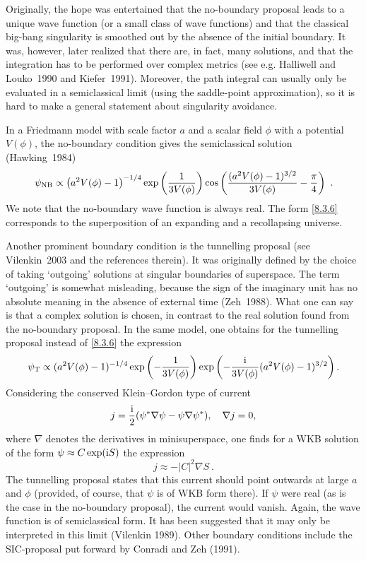 \documentclass[12pt,a4paper]{article}
\newcommand{\be}{\begin{equation}}
\newcommand{\ee}{\end{equation}}
\newcommand{\lb}{\label}
\newcommand{\I}{{\rm i}}
\begin{document}
Originally, the hope was entertained that the no-boundary proposal
leads to a unique wave function (or a small class of wave functions)
and that the classical big-bang singularity is smoothed out by the
absence of the initial boundary. It was, however, later realized that
there are, in fact, many solutions, and that the integration has to be
performed over complex metrics (see e.g. Halliwell and Louko~1990 and
Kiefer~1991). Moreover, the path integral can usually only be
evaluated in a semiclassical limit (using the saddle-point
approximation), so it is hard to make a general statement about
singularity avoidance. 

In a Friedmann model with scale factor $a$ and a scalar field $\phi$
with a potential $V(\phi)$, the no-boundary condition gives the
semiclassical solution (Hawking~1984) 
\be
\lb{8.3.6}
\psi_{\rm NB}\propto \left(a^2V(\phi)-1\right)^{-1/4}
\exp\left(\frac{1}{3V(\phi)}
\right)\cos\left(\frac{(a^2V(\phi)-1)^{3/2}}{3V(\phi)}-\frac{\pi}{4}\right)\ .
\ee
We note that the no-boundary wave function is always real. The form
\eqref{8.3.6} corresponds to the superposition of an expanding and a
recollapsing universe.

Another prominent boundary condition is the tunnelling proposal
(see Vi\-len\-kin~2003 and the references therein). It was originally
defined by the choice of taking 
`outgoing' solutions at singular boundaries of superspace. The term
`outgoing' is somewhat misleading, because the sign of the imaginary
unit has no absolute meaning in the absence of external time
(Zeh~1988). What one can say is that a complex solution is chosen, in
contrast to the real solution found from the no-boundary proposal. In
the same model, one obtains for the tunnelling proposal instead of
\eqref{8.3.6} the expression 
\be
\lb{8.3.9}
\psi_{\rm T}\propto (a^2V(\phi)-1)^{-1/4}\exp\left(-\frac{1}{3V(\phi)}
\right)\exp\left(-\frac{\I}{3V(\phi)}(a^2V(\phi)-1)^{3/2}\right).
\ee
Considering the conserved Klein--Gordon type of current
\be
\lb{8.3.7}
j=\frac{\I}{2}(\psi^*\nabla\psi-\psi\nabla\psi^*) , \quad \nabla j=0,
\ee
where $\nabla$ denotes the derivatives in minisuperspace, one finds for
a WKB solution of the form $\psi\approx C\exp(\I S)$ the expression
\be
\lb{8.3.8}
j\approx -\vert C\vert^2\nabla S\ .
\ee
The tunnelling proposal states that this current should point outwards
at large $a$ and $\phi$ (provided, of course, that $\psi$ is of WKB form 
there). If $\psi$ were real (as is the case in the no-boundary proposal),
the current would vanish. Again, the wave function is of semiclassical
form. It has been suggested that it may only be interpreted in this
limit (Vilenkin 1989). Other boundary conditions include the
SIC-proposal put forward by Conradi and Zeh (1991).
\end{document}
